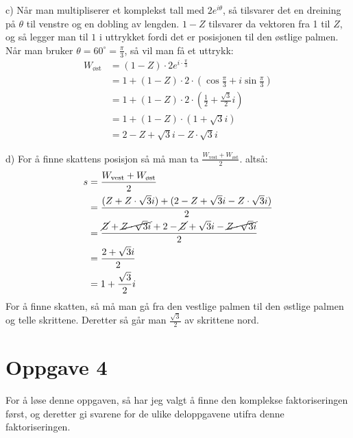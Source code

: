 \documentclass[12pt, a4paper]{article}
\begin{document}
c) Når man multipliserer et komplekst tall med $2e^{i\theta}$, så tilsvarer det en dreining på $\theta$ til venstre og en dobling av lengden. $1 - Z$ tilsvarer da vektoren fra 1 til $Z$, og så legger man til $1$ i uttrykket fordi det er posisjonen til den østlige palmen. \\
Når man bruker $\theta = 60^\circ = \frac{\pi}{3}$, så vil man få et uttrykk:
\begin{equation}
    \begin{split}
        W_{\text{øst}} &= (1 - Z) \cdot 2e^{i \cdot \frac{\pi}{3}} \\
                &= 1 + (1 - Z) \cdot 2 \cdot (\cos{\frac{\pi}{3}} + i\sin{\frac{\pi}{3}}) \\
                &= 1 + (1 - Z) \cdot 2 \cdot (\frac{1}{2} + \frac{\sqrt{3}}{2}i) \\
                &= 1 + (1 - Z) \cdot (1 + \sqrt{3}i) \\
                &= 2 - Z + \sqrt{3}i - Z \cdot \sqrt{3}i
    \end{split}
\end{equation}

d) For å finne skattens posisjon så må man ta $\frac{W_{\text{vest}} + W_{\text{øst}}}{2}$. altså:
\begin{equation}
    \begin{split}
        s &= \frac{W_{\text{vest}} + W_{\text{øst}}}{2} \\
          &= \frac{(Z + Z \cdot \sqrt{3}i) + (2 - Z + \sqrt{3}i - Z \cdot \sqrt{3}i)}{2} \\
          &= \frac{\cancel{Z} + \cancel{Z \cdot \sqrt{3}i} + 2 - \cancel{Z} + \sqrt{3}i - \cancel{Z \cdot \sqrt{3}i}}{2} \\
          &= \frac{2 + \sqrt{3}i}{2} \\
          &= 1 + \frac{\sqrt{3}}{2}i
    \end{split}
\end{equation}
For å finne skatten, så må man gå fra den vestlige palmen til den østlige palmen og telle skrittene. Deretter så går man $\frac{\sqrt{3}}{2}$ av skrittene nord.



\newpage

\section*{Oppgave 4}
For å løse denne oppgaven, så har jeg valgt å finne den komplekse faktoriseringen først, og deretter gi
svarene for de ulike deloppgavene utifra denne faktoriseringen.
\newline\newline
\end{document}
